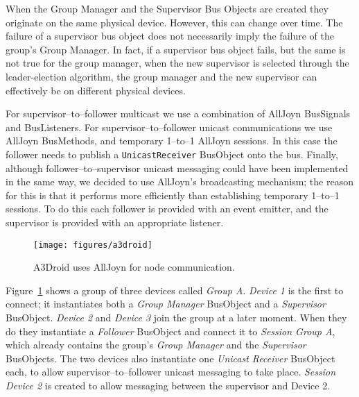 When the Group Manager and the Supervisor Bus Objects are created they originate on the same physical device. However, this can change over time. The failure of a supervisor bus object does not necessarily imply the failure of the group's Group Manager. In fact, if a supervisor bus object fails, but the same is not true for the group manager, when the new supervisor is selected through the leader-election algorithm, the group manager and the new supervisor can effectively be on different physical devices. 

For supervisor--to--follower multicast we use a combination of AllJoyn BusSignals and BusListeners. For supervisor--to--follower unicast communications we use AllJoyn BusMethods, and temporary 1--to--1 AllJoyn sessions. In this case the follower needs to publish a \texttt{UnicastReceiver} BusObject onto the bus. Finally, although follower--to--supervisor unicast messaging could have been implemented in the same way, we decided to use AllJoyn's broadcasting mechanism; the reason for this is that it performs more efficiently than establishing temporary 1--to--1 sessions. To do this each follower is provided with an event emitter, and the supervisor is provided with an appropriate listener.

\begin{figure}[h!]
\centering
\texttt{[image: figures/a3droid]}
\caption{A3Droid uses AllJoyn for node communication.}
\label{fig:communication}
\end{figure}


Figure~\ref{fig:communication} shows a group of three devices called \emph{Group A}. \emph{Device 1} is the first to connect; it instantiates both a \emph{Group Manager} BusObject and a \emph{Supervisor} BusObject. \emph{Device 2} and \emph{Device 3} join the group at a later moment. When they do they instantiate a \emph{Follower} BusObject and connect it to \emph{Session Group A}, which already contains the group's \emph{Group Manager} and the \emph{Supervisor} BusObjects. The two devices also instantiate one \emph{Unicast Receiver} BusObject each, to allow supervisor--to--follower unicast messaging to take place. \emph{Session Device 2} is created to allow messaging between the supervisor and Device 2.













